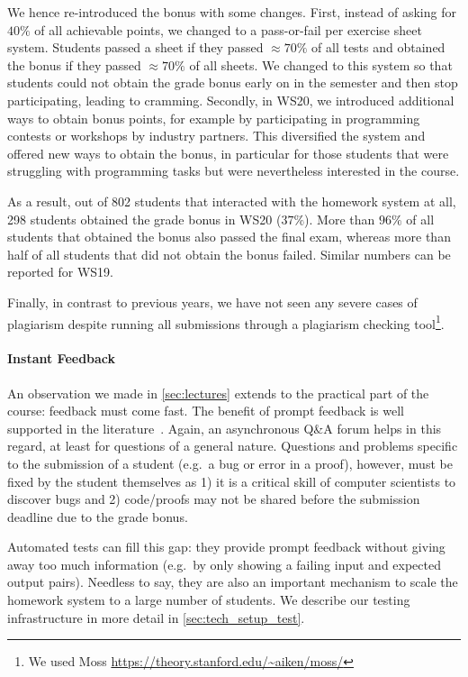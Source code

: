 We hence re-introduced the bonus with some changes.
First, instead of asking for $40\%$ of all achievable points,
we changed to a pass-or-fail per exercise sheet system.
Students passed a sheet if they
passed $\approx 70\%$ of all tests
and obtained the bonus if they passed $\approx 70\%$ of all sheets.
We changed to this system so that students
could not obtain the grade bonus early on in the semester and then stop participating,
leading to cramming.
Secondly, in WS20, we introduced additional ways to
obtain bonus points,
for example by participating in programming contests or workshops by industry partners.
This diversified the system and offered new ways
to obtain the bonus,
in particular for those students that were struggling
with programming tasks but were nevertheless interested in the course.

As a result, out of 802 students that interacted with the homework system at all, 298 students obtained the grade bonus in WS20 ($37\%$).
More than $96\%$ of all students that obtained the bonus
also passed the final exam,
whereas more than half of all students that did not obtain the bonus failed.
Similar numbers can be reported for WS19.

Finally, in contrast to previous years,
we have not seen any severe cases of plagiarism despite
running all submissions through a plagiarism checking tool\footnote{We used Moss \url{https://theory.stanford.edu/~aiken/moss/}}.

\paragraph{Instant Feedback}
An observation we made in \cref{sec:lectures}
extends to the practical part of the course:
feedback must come fast.
The benefit of prompt feedback is well supported in the literature~\cite{onlineengagement2,onlineengagement4}.
Again, an asynchronous Q\&A forum helps in this regard,
at least for questions of a general nature.
Questions and problems specific to the submission of a student (e.g.\ a bug or error in a proof),
however, must be fixed by the student themselves as 1) it is a critical skill of computer scientists to discover bugs and 2) code/proofs may not be shared before the submission deadline due to the grade bonus.

Automated tests can fill this gap:
they provide prompt feedback without giving away too much information (e.g.\ by only showing a failing input and expected output pairs).
Needless to say, they are also an important mechanism
to scale the homework system to a large number of students.
We describe our testing infrastructure in more detail in \cref{sec:tech_setup_test}.

